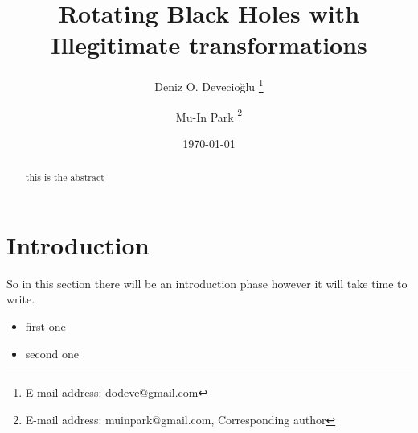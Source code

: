 \documentclass[preprint,aps,tightenlines,showkeys,nofootinbib,superscriptaddress]{revtex4}
\begin{document}

\title{Rotating Black Holes with Illegitimate transformations}

\author{Deniz O. Devecio\u{g}lu \footnote{E-mail address: dodeve@gmail.com}}

\author{Mu-In Park \footnote{E-mail address: muinpark@gmail.com,
Corresponding author}}
\date{\today}

\begin{abstract}
  this is the abstract

\end{abstract}


\maketitle

\newpage

\section{Introduction}
So in this section there will be an introduction phase however it
will take time to write.
\begin{itemize}
  \item first one
  \item second one
\end{itemize}
\end{document}
